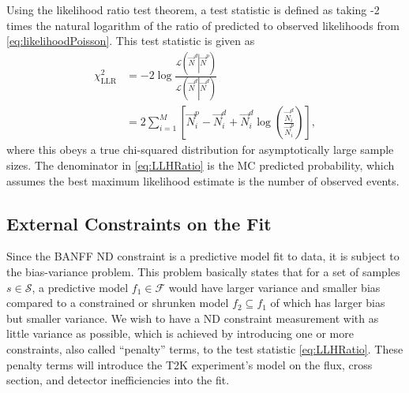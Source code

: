 Using the likelihood ratio test theorem, a test statistic is defined
as taking -2 times the natural logarithm of the ratio of predicted
to observed likelihoods from \eqref{eq:likelihoodPoisson}. This test
statistic is given as
\begin{equation}
\begin{aligned}\chi_{\text{LLR}}^{2} & =-2\log\frac{\mathcal{L}\left(\vec{N}^{d}\left|\vec{N}^{p}\right.\right)}{\mathcal{L}\left(\vec{N}^{d}\left|\vec{N}^{d}\right.\right)}\\
 & =2\sum_{i=1}^{M}\left[\vec{N}_{i}^{p}-\vec{N}_{i}^{d}+\vec{N}_{i}^{d}\log\left(\frac{\vec{N}_{i}^{d}}{\vec{N}_{i}^{p}}\right)\right],
\end{aligned}
\label{eq:LLHRatio}
\end{equation}
where this obeys a true chi-squared distribution for asymptotically
large sample sizes. The denominator in \eqref{eq:LLHRatio} is the
MC predicted probability, which assumes the best maximum likelihood
estimate is the number of observed events.

\subsection{External Constraints on the Fit}

Since the BANFF ND constraint is a predictive model fit to data, it
is subject to the bias-variance problem. This problem basically states
that for a set of samples $s\in\mathcal{S}$, a predictive model $f_{1}\in\mathcal{F}$
would have larger variance and smaller bias compared to a constrained
or shrunken model $f_{2}\subseteq f_{1}$ of which has larger bias
but smaller variance. We wish to have a ND constraint measurement
with as little variance as possible, which is achieved by introducing
one or more constraints, also called ``penalty'' terms, to the test
statistic \eqref{eq:LLHRatio}. These penalty terms will introduce
the T2K experiment's model on the flux, cross section, and detector
inefficiencies into the fit.

